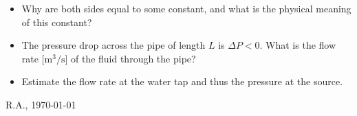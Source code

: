 \documentclass[12pt,a4paper]{article}
\begin{document}
    \begin{itemize}
    \item  
        Why are both sides equal to some constant,
        and
        what is the physical meaning of this constant?
    \item
        The pressure drop across the pipe 
        of length $L$ is $\Delta P < 0$.
        What is the flow rate [$\mathrm{m^3 / s}$]
        of the fluid through the pipe?
    \item
        Estimate the flow rate at the water tap
        and 
        thus the pressure at the source.
    \end{itemize}


    
    
    
    


    \vfill\hfill 
    {\small\textcopyright} R.A., \today
\end{document}
